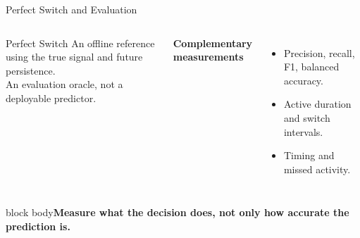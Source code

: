 \documentclass[aspectratio=169,10pt]{beamer}
\newcommand{\takeaway}[1]{\vfill\begin{beamercolorbox}[sep=2mm,wd=\textwidth]{block body}\small\textbf{#1}\end{beamercolorbox}}
\begin{document}
\begin{frame}{Perfect Switch and Evaluation}
\begin{columns}[T,onlytextwidth]
\begin{block}{Perfect Switch}
An offline reference using the true signal and future persistence.\\[2mm]
An evaluation oracle, not a deployable predictor.
\end{block}
\vspace{2mm}
\textbf{Complementary measurements}
\begin{itemize}
\item Precision, recall, F1, balanced accuracy.
\item Active duration and switch intervals.
\item Timing and missed activity.
\end{itemize}
\vspace{8mm} %
\hspace{9mm} %
\end{columns}
\vspace{2mm}
\takeaway{Measure what the decision does, not only how accurate the prediction is.}
\end{frame}
\end{document}
